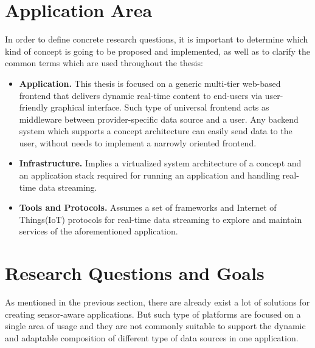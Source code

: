 \section{Application Area}
     In order to define concrete research questions, it is important to determine which kind of concept is going to be proposed and implemented, as well as to clarify the common terms which are used throughout the thesis:
     \begin{itemize}
          \item \textbf{Application.} This thesis is focused on a generic multi-tier web-based frontend that delivers dynamic real-time content to end-users via user-friendly graphical interface. Such type of universal frontend acts as middleware between provider-specific data source and a user. Any backend system which supports a concept architecture can easily send data to the user, without needs to implement a narrowly oriented frontend.

          \item \textbf{Infrastructure.} Implies a virtualized system architecture of a concept and an application stack required for running an application and handling real-time data streaming.

          \item \textbf{Tools and Protocols.} Assumes a set of frameworks and Internet of Things(IoT) protocols for real-time data streaming to explore and maintain services of the aforementioned application.
     \end{itemize}


\section{Research Questions and Goals}
       As mentioned in the previous section, there are already exist a lot of solutions for creating sensor-aware applications. But such type of platforms are focused on a single area of usage and they are not commonly suitable to support the dynamic and adaptable composition of different type of data sources in one application.

